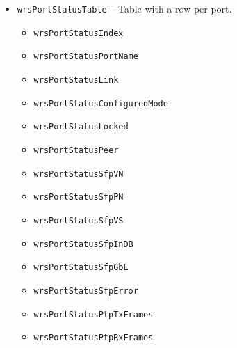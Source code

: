 \begin{itemize}
  \item \texttt{wrsPortStatusTable} -- Table with a row per port.
    \begin{itemize}
      \item \texttt{wrsPortStatusIndex}
      \item \texttt{wrsPortStatusPortName}
      \item \texttt{wrsPortStatusLink}
      \item \texttt{wrsPortStatusConfiguredMode}
      \item \texttt{wrsPortStatusLocked}
      \item \texttt{wrsPortStatusPeer}
      \item \texttt{wrsPortStatusSfpVN}
      \item \texttt{wrsPortStatusSfpPN}
      \item \texttt{wrsPortStatusSfpVS}
      \item \texttt{wrsPortStatusSfpInDB}
      \item \texttt{wrsPortStatusSfpGbE}
      \item \texttt{wrsPortStatusSfpError}
      \item \texttt{wrsPortStatusPtpTxFrames}
      \item \texttt{wrsPortStatusPtpRxFrames}
    \end{itemize}


\end{itemize}

%
%
